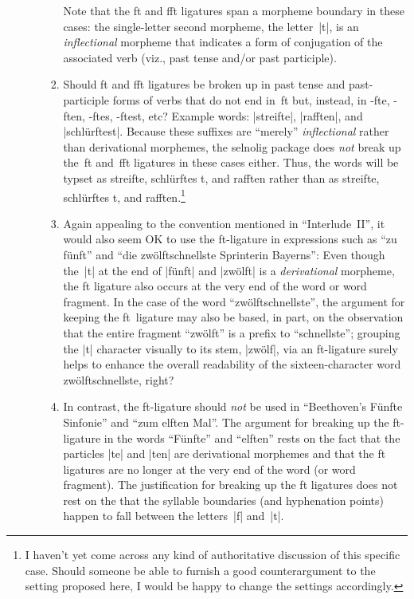 \documentclass[11pt]{article}
\newcommand{\pkg}[1]{\textsf{#1}}
\begin{document}
\begin{enumerate}
\begin{enumerate}
\begin{enumerate}
Note that the ft and fft ligatures span a morpheme boundary in these cases: the single-letter second morpheme, the letter~|t|, is an \emph{inflectional} morpheme that indicates a form of conjugation of the associated verb (viz., past tense and/or past participle).

\item Should ft and fft ligatures be broken up in past tense and past-participle forms of verbs that do not end in~ft but, instead, in -fte, -ften, -ftes, -ftest, etc? Example words: |streifte|, |rafften|, and |schlürftest|. Because these suffixes are \enquote{merely} \emph{inflectional} rather than derivational morphemes, the \pkg{selnolig} package does \emph{not} break up the~ft and~fft ligatures in these cases either. Thus, the words will be typset as streifte, schlürftes\kern0pt t, and rafften rather than as streif\breaklig te, schlürf\breaklig tes\kern0pt t, and raff\breaklig ten.\footnote{I haven't yet come across any kind of authoritative discussion of this specific case. Should someone be able to furnish a good counterargument to the setting proposed here, I would be happy to change the settings accordingly.}


\item Again appealing to the convention mentioned in \enquote{Interlude~II}, it would also seem OK to use the ft-ligature in expressions such as \enquote{zu fünft} and \enquote{die zwölftschnellste Sprinterin Bayerns}: Even though the~|t| at the end of |fünft| and |zwölft| is a \emph{derivational} morpheme, the ft ligature also occurs at the very end of the word or word fragment. In the case of the word \enquote{zwölftschnellste}, the argument for keeping the ft~ligature may also be based, in part, on the observation that the entire fragment \enquote{zwölft} is a prefix to \enquote{schnellste}; grouping the |t| character visually to its stem, |zwölf|, via an ft-ligature surely helps to enhance the overall readability of the sixteen-character word zwölftschnellste, right?

\item In contrast, the ft-ligature should \emph{not} be used in \enquote{Beethoven's Fünfte Sinfonie} and \enquote{zum elften Mal}. The argument for breaking up the ft-ligature in the words \enquote{Fünfte} and \enquote{elften} rests on the fact that the particles |te| and |ten| are derivational morphemes and that the ft ligatures are no longer at the very end of the word (or word fragment). The justification for breaking up the ft ligatures does not rest on the that the syllable boundaries (and hyphenation points) happen to fall between the letters~|f| and~|t|.
\end{enumerate}
\end{enumerate}


\end{enumerate}
\end{document}
